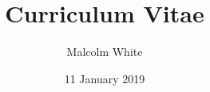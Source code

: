 \title{Curriculum Vitae}
\author{Malcolm White}
\date{11 January 2019}

\address{50 Oakland St., Floor 2, Medford, MA 02155}
